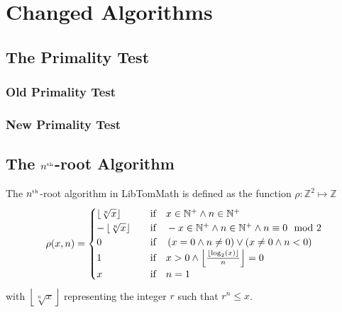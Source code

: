 \documentclass[a4paper,10pt]{report}
\providecommand{\floor}[1]{\left\lfloor#1\right\rfloor}
\newcommand{\nthroot}{$n^{\text{\tiny th}}$-root}
\newcommand{\RaiseNum}[2]{\raisebox{#1}{$\scriptstyle #2$}}
\theoremstyle{plain} %
\theoremstyle{definition}
\theoremstyle{remark}
\begin{document}
\chapter{Changed Algorithms}
\section{The Primality Test}
\subsection{Old Primality Test}
\subsection{New Primality Test}

\section{The \nthroot{} Algorithm}
The \nthroot{} algorithm in LibTomMath\cite{denislibtommath} is defined as the function $\rho\colon\mathbb{Z}^2\mapsto\mathbb{Z}$
\begin{equation}\label{eq:basicdefinition}
\rho(x,n) = 
\begin{cases}
\floor{\sqrt[n]{x}}&\quad\text{if}\quad x \in \mathbb{N}^+\land n \in \mathbb{N}^+ \\
-\floor{\sqrt[n]{x}}&\quad\text{if}\quad -x \in \mathbb{N}^+ \land n \in \mathbb{N}^+ \land n \equiv 0 \mod 2\\
0&\quad\text{if}\quad \left(x = 0 \land n \not= 0\right) \lor \left(x \not=0 \land n < 0\right)\\
1&\quad\text{if}\quad x > 0 \land \floor{\frac{ {\RaiseNum{2pt}{\floor{\log_2\left(x\right)}} }}{n}} = 0\\
x&\quad\text{if}\quad n = 1
\end{cases}
\end{equation}
with $\floor{\sqrt[n]{x}}$ representing the integer $r$ such that $r^n \leq x$.
\end{document}
